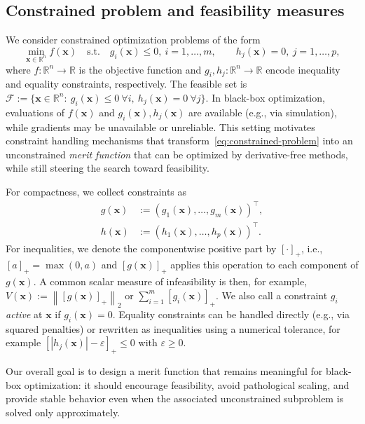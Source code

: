 \documentclass[11pt,a4paper]{article}
\numberwithin{equation}{section}
\numberwithin{figure}{section}
\numberwithin{table}{section}
\theoremstyle{definition}
\newcommand{\R}{\mathbb{R}}
\newcommand{\norm}[1]{\left\lVert #1 \right\rVert}
\newcommand{\pos}[1]{\left[#1\right]_+}
\begin{document}
\subsection{Constrained problem and feasibility measures}\label{subsec:al-setting}
We consider constrained optimization problems of the form
\begin{equation}
\label{eq:constrained-problem}
  \min_{\bm{x}\in \R^n} f(\bm{x})
  \quad\text{s.t.}\quad
  g_i(\bm{x}) \le 0,\ i=1,\dots,m,
  \qquad
  h_j(\bm{x}) = 0,\ j=1,\dots,p,
\end{equation}
where $f:\R^n\to\R$ is the objective function and $g_i,h_j:\R^n\to\R$ encode inequality and equality constraints, respectively. The feasible set is
\(
\mathcal{F}:=\{\bm{x}\in\R^n:\ g_i(\bm{x})\le 0\ \forall i,\ h_j(\bm{x})=0\ \forall j\}.
\)
In black-box optimization, evaluations of $f(\bm{x})$ and $g_i(\bm{x}),h_j(\bm{x})$ are available (e.g., via simulation), while gradients may be unavailable or unreliable. This setting motivates constraint handling mechanisms that transform~\eqref{eq:constrained-problem} into an unconstrained \emph{merit function} that can be optimized by derivative-free methods, while still steering the search toward feasibility.

For compactness, we collect constraints as
\begin{equation}
  \begin{aligned}
    g(\bm{x}) &:= (g_1(\bm{x}),\dots,g_m(\bm{x}))^\top,\\
    h(\bm{x}) &:= (h_1(\bm{x}),\dots,h_p(\bm{x}))^\top.
  \end{aligned}
\end{equation}
For inequalities, we denote the componentwise positive part by $\pos{\cdot}$, i.e., $\pos{a}=\max(0,a)$ and $\pos{g(\bm{x})}$ applies this operation to each component of $g(\bm{x})$. A common scalar measure of infeasibility is then, for example,
\(
V(\bm{x}) := \norm{\pos{g(\bm{x})}}_2
\)
or $\sum_{i=1}^m \pos{g_i(\bm{x})}$.
We also call a constraint $g_i$ \emph{active} at $\bm{x}$ if $g_i(\bm{x})=0$.\cite{DufosseHansen}
Equality constraints can be handled directly (e.g., via squared penalties) or rewritten as inequalities using a numerical tolerance, for example $\pos{|h_j(\bm{x})|-\varepsilon}\le 0$ with $\varepsilon\ge 0$.\cite{DufosseHansen,Atamna2016}

Our overall goal is to design a merit function that remains meaningful for black-box optimization: it should encourage feasibility, avoid pathological scaling, and provide stable behavior even when the associated unconstrained subproblem is solved only approximately.
\end{document}
